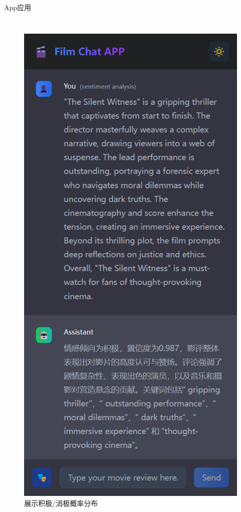 \documentclass{beamer}
\begin{document}
\begin{frame}{App应用}
    \begin{columns}[T]
        \begin{figure}
            \includegraphics[width=\textwidth,height=0.7\textheight,keepaspectratio]{pic/display1.png}
            \centering
            \\
            \small{展示积极/消极概率分布}
        \end{figure}
        

\end{columns}
\end{frame}
\end{document}
